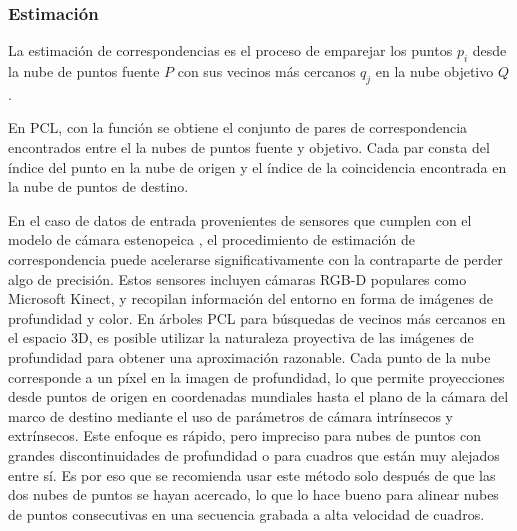 \subsubsection{Estimación}
La estimación de correspondencias es el proceso de emparejar los puntos $p_i$ desde la nube de puntos fuente $P$ con sus vecinos más cercanos $q_j$ en la nube objetivo $Q$. 

En PCL, con la función  se obtiene el conjunto de pares de correspondencia encontrados entre el la nubes de puntos fuente y objetivo. Cada par consta del índice del punto en la nube de origen y el índice de la coincidencia encontrada en la nube de puntos de destino. 

En el caso de datos de entrada provenientes de sensores que cumplen con el modelo de cámara estenopeica \cite{kaehler2017}, el procedimiento de estimación de correspondencia puede acelerarse significativamente con la contraparte de perder algo de precisión. Estos sensores incluyen cámaras RGB-D populares como Microsoft Kinect, y recopilan información del entorno en forma de imágenes de profundidad y color. En árboles PCL para búsquedas de vecinos más cercanos en el espacio 3D, es posible utilizar la naturaleza proyectiva de las imágenes de profundidad para obtener una aproximación razonable. Cada punto de la nube corresponde a un píxel en la imagen de profundidad, lo que permite proyecciones desde puntos de origen en coordenadas mundiales hasta el plano de la cámara del marco de destino mediante el uso de parámetros de cámara intrínsecos y extrínsecos. Este enfoque es rápido, pero impreciso para nubes de puntos con grandes discontinuidades de profundidad o para cuadros que están muy alejados entre sí. Es por eso que se recomienda usar este método solo después de que las dos nubes de puntos se hayan acercado, lo que lo hace bueno para alinear nubes de puntos consecutivas en una secuencia grabada a alta velocidad de cuadros.


